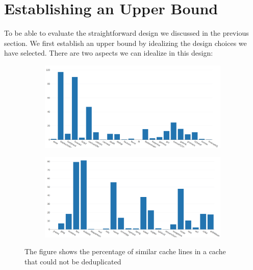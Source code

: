 \section{Establishing an Upper Bound}
\label{sec:Upper Bound}
To be able to evaluate the straightforward design we discussed in the previous section. We first establish an upper bound by idealizing the design choices we have selected. There are two aspects we can idealize in this design:
\begin{figure}
    \begin{subfigure}[t]{\textwidth}
        \includegraphics[width=\textwidth]{MissedDedup1.png}
    \end{subfigure}
    \begin{subfigure}[b]{\textwidth}
        \includegraphics[width=\textwidth]{MissedDedup2.png}
    \end{subfigure}
    \caption[Missed Dedup Opportunity]{The figure shows the percentage of similar cache lines in a cache that could not be deduplicated}
    \label{fig:MissedDedup}
\end{figure}
